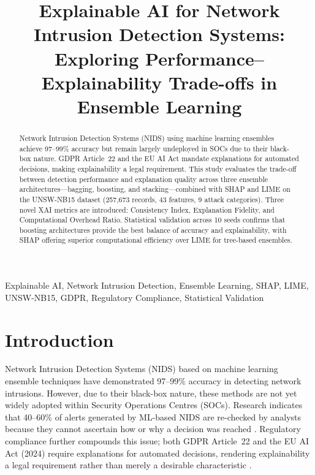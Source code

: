 \documentclass[conference]{IEEEtran}
\title{Explainable AI for Network Intrusion Detection Systems:\\
Exploring Performance--Explainability Trade-offs in Ensemble Learning}
\author{
\IEEEauthorblockN{Himaja}
\IEEEauthorblockA{Student ID: 24279048\\
H9AIMLC -- AI/ML in Cybersecurity\\
National College of Ireland\\
Dublin, Ireland}
}
\begin{document}
\maketitle

\begin{abstract}
Network Intrusion Detection Systems (NIDS) using machine learning ensembles achieve 97--99\% accuracy but remain largely undeployed in SOCs due to their black-box nature. GDPR Article~22 and the EU AI Act mandate explanations for automated decisions, making explainability a legal requirement. This study evaluates the trade-off between detection performance and explanation quality across three ensemble architectures---bagging, boosting, and stacking---combined with SHAP and LIME on the UNSW-NB15 dataset (257{,}673 records, 43 features, 9 attack categories). Three novel XAI metrics are introduced: Consistency Index, Explanation Fidelity, and Computational Overhead Ratio. Statistical validation across 10 seeds confirms that boosting architectures provide the best balance of accuracy and explainability, with SHAP offering superior computational efficiency over LIME for tree-based ensembles.
\end{abstract}

\begin{IEEEkeywords}
Explainable AI, Network Intrusion Detection, Ensemble Learning, SHAP, LIME, UNSW-NB15, GDPR, Regulatory Compliance, Statistical Validation
\end{IEEEkeywords}

\section{Introduction}

Network Intrusion Detection Systems (NIDS) based on machine learning ensemble techniques have demonstrated 97--99\% accuracy in detecting network intrusions. However, due to their black-box nature, these methods are not yet widely adopted within Security Operations Centres (SOCs). Research indicates that 40--60\% of alerts generated by ML-based NIDS are re-checked by analysts because they cannot ascertain how or why a decision was reached \cite{pawlicki2024}. Regulatory compliance further compounds this issue; both GDPR Article~22 and the EU AI Act (2024) require explanations for automated decisions, rendering explainability a legal requirement rather than merely a desirable characteristic \cite{khan2025}.
\end{document}
